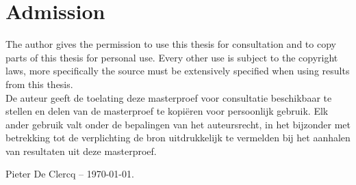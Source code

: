 
\chapter*{Admission}
\noindent The author gives the permission to use this thesis for consultation and to copy parts of this thesis for personal use. Every other use is subject to the copyright laws, more specifically the source must be extensively specified when using results from this thesis.\\

\noindent De auteur geeft de toelating deze masterproef voor consultatie beschikbaar te stellen en delen van de masterproef te kopi\"eren voor persoonlijk gebruik. Elk ander gebruik valt onder de bepalingen van het auteursrecht, in het bijzonder met betrekking tot de verplichting de bron uitdrukkelijk te vermelden bij het aanhalen van resultaten uit deze masterproef.\\


\noindent Pieter De Clercq -- \today.